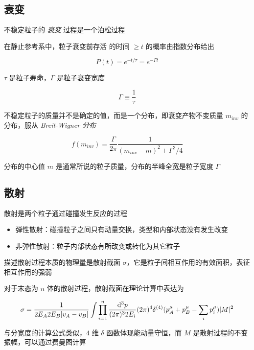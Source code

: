 \subsection{衰变}

不稳定粒子的 \emph{衰变} 过程是一个泊松过程

在静止参考系中，粒子衰变前存活 的时间 $\ge t$ 的概率由指数分布给出

\begin{equation}
    P(t) = e^{-t/\tau} = e^{-\Gamma t}
\end{equation}

$\tau$ 是粒子寿命，$\Gamma$ 是粒子衰变宽度

\begin{equation}
    \Gamma \equiv \frac{1}{\tau}
\end{equation}

不稳定粒子的质量并不是确定的值，而是一个分布，即衰变产物不变质量 $m_{inv}$ 的分布，服从 \emph{Breit-Wigner 分布}

\begin{equation}
    f(m_{inv}) = \frac{\Gamma}{2\pi} \frac{1}{(m_{inv}-m)^2+\Gamma^2/4}
\end{equation}

分布的中心值 $m$ 是通常所说的粒子质量，分布的半峰全宽是粒子宽度 $\Gamma$

\subsection{散射}

散射是两个粒子通过碰撞发生反应的过程

\begin{itemize}
    \item 弹性散射：碰撞粒子之间只有动量交换，类型和内部状态没有发生改变
    \item 非弹性散射：粒子内部状态有所改变或转化为其它粒子
\end{itemize}

描述散射过程本质的物理量是散射截面 $\sigma$，它是粒子间相互作用的有效面积，表征相互作用的强弱

对于末态为 $n$ 体的散射过程，散射截面在理论计算中表达为

\begin{equation}
    \sigma = \frac{1}{2 E_A 2 E_B |v_A-v_B|} \int \prod_{i=1}^n \frac{\mathop{}\!\mathrm{d}^3 p}{(2\pi)^3 2 E_i} (2\pi)^4 \delta^{(4)} (p^\mu_A + p^\mu_B - \sum_i p^\mu_i) |M|^2
\end{equation}

与分宽度的计算公式类似，$4$ 维 $\delta$ 函数体现能动量守恒，而 $M$ 是散射过程的不变振幅，可以通过费曼图计算

